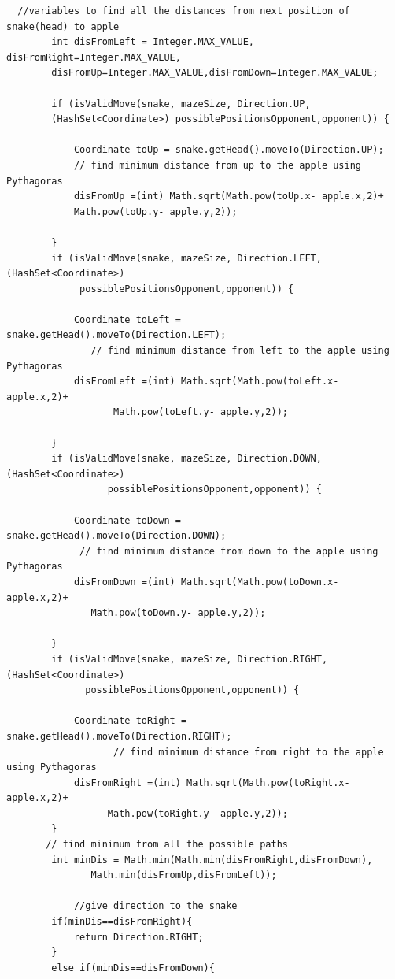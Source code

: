 \documentclass[a4paper,12pt]{article}
\begin{document}
\begin{verbatim}
  //variables to find all the distances from next position of snake(head) to apple
        int disFromLeft = Integer.MAX_VALUE, disFromRight=Integer.MAX_VALUE,
		disFromUp=Integer.MAX_VALUE,disFromDown=Integer.MAX_VALUE;

        if (isValidMove(snake, mazeSize, Direction.UP, 
		(HashSet<Coordinate>) possiblePositionsOpponent,opponent)) {

            Coordinate toUp = snake.getHead().moveTo(Direction.UP);
            // find minimum distance from up to the apple using Pythagoras
            disFromUp =(int) Math.sqrt(Math.pow(toUp.x- apple.x,2)+
			Math.pow(toUp.y- apple.y,2));

        }
        if (isValidMove(snake, mazeSize, Direction.LEFT,(HashSet<Coordinate>) 
		     possiblePositionsOpponent,opponent)) {

            Coordinate toLeft = snake.getHead().moveTo(Direction.LEFT);
               // find minimum distance from left to the apple using Pythagoras
            disFromLeft =(int) Math.sqrt(Math.pow(toLeft.x- apple.x,2)+
			       Math.pow(toLeft.y- apple.y,2));

        }
        if (isValidMove(snake, mazeSize, Direction.DOWN,(HashSet<Coordinate>) 
		          possiblePositionsOpponent,opponent)) {

            Coordinate toDown = snake.getHead().moveTo(Direction.DOWN);
             // find minimum distance from down to the apple using Pythagoras
            disFromDown =(int) Math.sqrt(Math.pow(toDown.x- apple.x,2)+
			   Math.pow(toDown.y- apple.y,2));

        }
        if (isValidMove(snake, mazeSize, Direction.RIGHT,(HashSet<Coordinate>)
		      possiblePositionsOpponent,opponent)) {

            Coordinate toRight = snake.getHead().moveTo(Direction.RIGHT);
                   // find minimum distance from right to the apple using Pythagoras
            disFromRight =(int) Math.sqrt(Math.pow(toRight.x- apple.x,2)+
			      Math.pow(toRight.y- apple.y,2));
        }
       // find minimum from all the possible paths
        int minDis = Math.min(Math.min(disFromRight,disFromDown),
		       Math.min(disFromUp,disFromLeft));
            
            //give direction to the snake
        if(minDis==disFromRight){
            return Direction.RIGHT;
        } 
        else if(minDis==disFromDown){


\end{verbatim}
\end{document}
